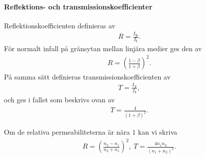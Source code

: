 \paragraph{Reflektions- och transmissionskoefficienter}
Reflektionskoefficienten definieras av
\begin{align*}
	R = \frac{I_{\text{R}}}{I_{\text{I}}}.
\end{align*}
För normalt infall på gränsytan mellan linjära medier ges den av
\begin{align*}
	R = \left(\frac{1 - \beta}{1 + \beta}\right)^{2}.
\end{align*}
På samma sätt definieras transmissionskoefficienten av
\begin{align*}
	T = \frac{I_{\text{T}}}{I_{\text{I}}},
\end{align*}
och ges i fallet som beskrivs ovan av
\begin{align*}
	T = \frac{4}{(1 + \beta)^{2}}.
\end{align*}

Om de relativa permeabiliteterna är nära $1$ kan vi skriva
\begin{align*}
	R = \left(\frac{n_{2} - n_{1}}{n_{2} + n_{1}}\right)^{2},\ T = \frac{4n_{1}n_{2}}{(n_{1} + n_{2})^{2}}.
\end{align*}

